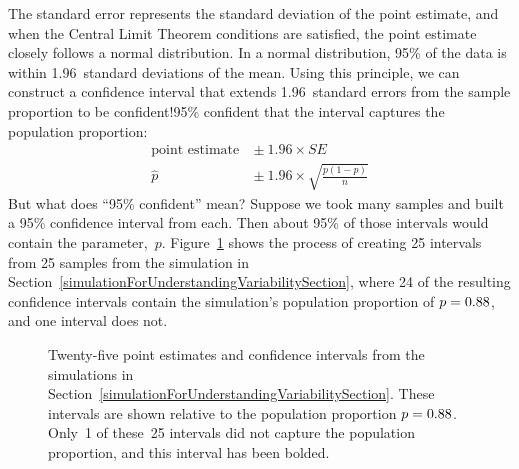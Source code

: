 The standard error represents the standard deviation
of the point estimate, and when the Central
Limit Theorem conditions are satisfied,
the point estimate closely follows a normal distribution.
In a normal distribution, 95\% of
the data is within 1.96~standard deviations of the mean.
Using this principle, we can construct a confidence
interval that extends 1.96~standard errors from the sample
proportion to be 
    {confident!95\% confident}
that the interval captures the population proportion:
\begin{align*}
\text{point estimate}\ &\pm\ 1.96 \times SE \\
\hat{p}\ &\pm\ 1.96 \times \sqrt{\frac{p (1 - p)}{n}}
\end{align*}
But what does ``95\% confident'' mean? Suppose we took
many samples and built a 95\% confidence interval from
each. Then about 95\% of those intervals would
contain the parameter,~$p$.
Figure~\ref{95PercentConfidenceInterval} shows the
process of creating 25 intervals from 25 samples
from the simulation in
Section~\ref{simulationForUnderstandingVariabilitySection},
where 24 of the resulting confidence intervals contain
the simulation's population proportion of
$p = 0.88{}$, and one interval does not.

\D{\newpage}

\begin{figure}
  \centering
  \caption{Twenty-five point estimates and confidence
      intervals from the simulations in
      Section~\ref{simulationForUnderstandingVariabilitySection}.
      These intervals are shown relative to the population
      proportion $p = 0.88{}$.
      Only~1 of these~25
      intervals did not capture the population
      proportion, and this interval has been bolded.}
  \label{95PercentConfidenceInterval}
\end{figure}

